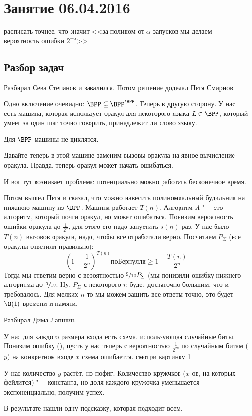 \chapter{Занятие 06.04.2016}

\TODO расписать точнее, что значит <<за полином от $\alpha$ запусков мы делаем вероятность ошибки $2^{-\alpha}$>>

\section{Разбор задач}
	Разбирал Сева Степанов и завалился.
	Потом решение доделал Петя Смирнов.

	Одно включение очевидно: $\BPP \subseteq \BPP^{\BPP}$.
	Теперь в другую сторону.
	У нас есть машина, которая использует оракул для некоторого языка
	$L\in\BPP$, который умеет за один шаг точно говорить, принадлежит ли слово языку.
	\begin{Rem}
		Для $\BPP$ машины не циклятся.
	\end{Rem}
	Давайте теперь в этой машине заменим вызовы оракула на явное вычисление оракула.
	Правда, теперь оракул может начать ошибаться.

	И вот тут возникает проблема: потенциально можно работать бесконечное время.

	Потом вышел Петя и сказал, что можно навесить полиномиальный будильник на нижнюю машину из $\BPP$.
	Машина работает $T(n)$.
	Алгоритм $A$ "--- это алгоритм, который почти оракул, но может ошибаться.
	Понизим вероятность ошибки оракула до $\frac{1}{2^{n}}$, для этого его надо запустить $s(n)$ раз.
	У нас было $T(n)$ вызовов оракула, надо, чтобы все отработали верно.
	Посчитаем $P_{\Sigma}$ (все оракулы ответили правильно):
	\[
		\left(1 - \frac{1}{2^n}\right)^{T(n)}
		по Бернулли
		\ge
		1 - \frac{T(n)}{2^n}
	\]
	Тогда мы ответим верно с вероятностью $\sfrac9{10} P_\Sigma$ (мы понизили ошибку нижнего алгоритма до $\sfrac9{10}$.
	Ну, $P_{\Sigma}$ с некоторого $n$ будет достаточно большим, что и требовалось.
	Для мелких $n$-то мы можем зашить все ответы точно, это будет $\O(1)$ времени и памяти.

	Разбирал Дима Лапшин.

	У нас для каждого размера входа есть схема, использующая случайные биты.
	Понизим ошибку (\TODO), пусть у нас теперь с вероятностью $\frac{1}{2^{2n}}$ по случайным битам ($y$)
	на конкретном входе $x$ схема ошибается.
	\TODO смотри картинку 1

	\begin{Rem}
		У нас количество $y$ растёт, но пофиг.
		Количество кружчков ($x$-ов, на которых фейлится) "--- константа,
		но доля каждого кружочка уменьшается экспоненциально, получим успех.
	\end{Rem}
	В результате нашли одну подсказку, которая подходит всем.

